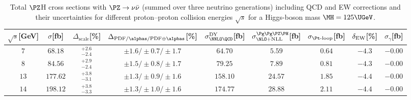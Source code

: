 \begin{table}
\begin{center}
\begin{small}
\end{small}%
\end{center}%
\vspace{2em}
\caption{Total $\PZ$H cross sections with $\PZ\to\nu\bar\nu$ (summed over three neutrino generations)
including QCD and EW corrections
and their uncertainties for different proton--proton collision energies
$\sqrt{s}$ for a Higgs-boson mass $\MH=125\UGeV$.}
\label{tab:znnh_XStot}
\begin{center}%
\begin{small}%
\begin{tabular}{ccccccccc}%
\hline
$\sqrt{s}$[GeV] & $\sigma$[fb] & $\Delta_{\mathrm{scale}}$[\%] & 
$\Delta_{\mathrm{PDF}/\alphas/\mathrm{PDF\oplus\alphas}}$[\%] &
$\sigma_{\NNLO \QCD}^{\DY}$[fb] & $\sigma^{\Pg\Pg\PZ\PH}_{\NLO+\NLL}$[fb] & 
$\sigma_{\Pt\mbox{\scriptsize -loop}}$[fb] & 
$\delta_{\mathrm{EW}}$[\%] & $\sigma_{\gamma}$[fb] 
\\
\hline
$7 $ & $  68.18$ & ${}_{-2.4}^{+ 2.6}$ & $\pm1.6/\pm0.7/\pm 1.7$ & $  64.70$ & $   5.59$ & $   0.64$ & $-4.3$ & $  -0.00$ \\ 
$8 $ & $  84.56$ & ${}_{-2.4}^{+ 2.9}$ & $\pm1.5/\pm0.8/\pm 1.7$ & $  79.25$ & $   7.89$ & $   0.81$ & $-4.3$ & $  -0.00$ \\ 
$13$ & $ 177.62$ & ${}_{-3.1}^{+ 3.8}$ & $\pm1.3/\pm0.9/\pm 1.6$ & $ 158.10$ & $  24.57$ & $   1.85$ & $-4.4$ & $  -0.00$ \\ 
$14$ & $ 198.12$ & ${}_{-3.3}^{+ 3.8}$ & $\pm1.3/\pm1.0/\pm 1.6$ & $ 174.77$ & $  28.88$ & $   2.11$ & $-4.4$ & $  -0.00$ \\ 
\hline
\end{tabular}%
\end{small}%
\end{center}%
\end{table}

